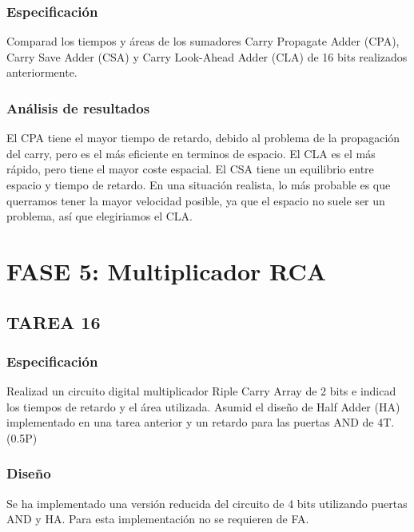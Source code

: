 \documentclass{article}
\begin{document}
		\subsubsection*{Especificación}
		Comparad los tiempos y áreas de los sumadores Carry Propagate Adder (CPA), Carry Save Adder (CSA) y Carry Look-Ahead Adder (CLA) de 16 bits realizados anteriormente.

		\subsubsection*{Análisis de resultados}
		El CPA tiene el mayor tiempo de retardo, debido al problema de la propagación del carry, pero es el más eficiente en terminos de espacio. El CLA es el más rápido, pero tiene el mayor coste espacial. El CSA tiene un equilibrio entre espacio y tiempo de retardo. 
		En una situación realista, lo más probable es que querramos tener la mayor velocidad posible, ya que el espacio no suele ser un problema, así que elegiriamos el CLA.
\section{FASE 5: Multiplicador RCA}

	\subsection{TAREA 16}
		\subsubsection*{Especificación}
		Realizad un circuito digital multiplicador Riple Carry Array de 2 bits e indicad los
		tiempos de retardo y el área utilizada. Asumid el diseño de Half Adder (HA) implementado en una
		tarea anterior y un retardo para las puertas AND de 4T. (0.5P)

		\subsubsection*{Diseño}
		Se ha implementado una versión reducida del circuito de 4 bits utilizando puertas AND y HA. Para esta implementación no se requieren de FA.
\end{document}

